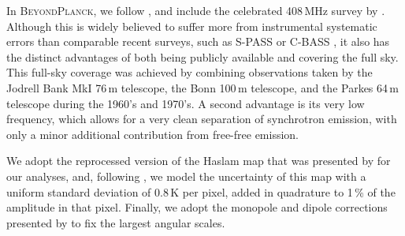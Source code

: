 \documentclass[onecolumn]{aa}
\newcommand{\BP}{\textsc{BeyondPlanck}}
\begin{document}
In \BP, we follow \citet{planck2014-a12}, and include the celebrated
408\,MHz survey by \citet{haslam1982}. Although this is widely
believed to suffer more from instrumental systematic errors than
comparable recent surveys, such as S-PASS \citep{Carretti:2019} or
C-BASS \citep{king2014}, it also has the distinct advantages of both
being publicly available and covering the full sky. This full-sky
coverage was achieved by combining observations taken by the Jodrell
Bank MkI 76\,m telescope, the Bonn 100\,m telescope, and the Parkes
64\,m telescope during the 1960's and 1970's. A second advantage is
its very low frequency, which allows for a very clean separation of
synchrotron emission, with only a minor additional contribution from
free-free emission.

We adopt the reprocessed version of the Haslam map that was presented
by \citet{remazeilles2014} for our analyses, and, following
\citet{planck2014-a12}, we model the uncertainty of this map with a
uniform standard deviation of 0.8\,K per pixel, added in quadrature to
1\,\% of the amplitude in that pixel. Finally, we adopt the monopole and
dipole corrections presented by \citet{wehus2014} to fix the largest
angular scales.

\end{document}
